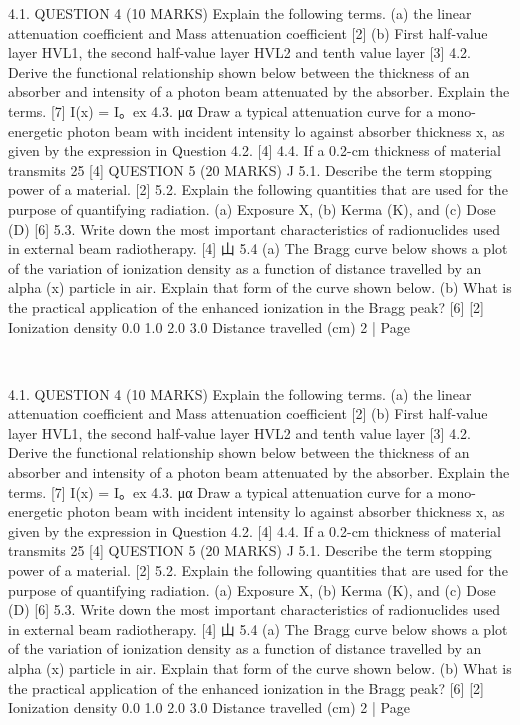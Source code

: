 \documentclass[addpoints]{exam}
\begin{document}
\begin{questions}
\begin{parts}
4.1.
QUESTION 4 (10 MARKS)
Explain the following terms.
(a) the linear attenuation coefficient and Mass attenuation coefficient
[2]
(b) First half-value layer HVL1, the second half-value layer HVL2 and tenth value layer [3]
4.2.
Derive the functional relationship shown below between the thickness of an absorber and intensity of a photon beam attenuated by the absorber. Explain the terms.
[7]
I(x) = I。ex
4.3.
μα
Draw a typical attenuation curve for a mono-energetic photon beam with incident intensity lo against absorber thickness x, as given by the expression in Question 4.2. [4]
4.4. If a 0.2-cm thickness of material transmits 25%
[4]
QUESTION 5 (20 MARKS)
J
5.1. Describe the term stopping power of a material.
[2]
5.2.
Explain the following quantities that are used for the purpose of quantifying radiation. (a) Exposure X, (b) Kerma (K),
and (c) Dose (D)
[6]
5.3.
Write down the most important characteristics of radionuclides used in external beam radiotherapy.
[4]
山
5.4 (a) The Bragg curve below shows a plot of the variation of ionization density as a function of distance travelled by an alpha (x) particle in air. Explain that form of the curve shown below.
(b) What is the practical application of the enhanced ionization in the Bragg peak?
[6]
[2]
Ionization density
0.0
1.0
2.0
3.0
Distance travelled (cm)
2 | Page

﻿

4.1.
QUESTION 4 (10 MARKS)
Explain the following terms.
(a) the linear attenuation coefficient and Mass attenuation coefficient
[2]
(b) First half-value layer HVL1, the second half-value layer HVL2 and tenth value layer [3]
4.2.
Derive the functional relationship shown below between the thickness of an absorber and intensity of a photon beam attenuated by the absorber. Explain the terms.
[7]
I(x) = I。ex
4.3.
μα
Draw a typical attenuation curve for a mono-energetic photon beam with incident intensity lo against absorber thickness x, as given by the expression in Question 4.2. [4]
4.4. If a 0.2-cm thickness of material transmits 25%
[4]
QUESTION 5 (20 MARKS)
J
5.1. Describe the term stopping power of a material.
[2]
5.2.
Explain the following quantities that are used for the purpose of quantifying radiation. (a) Exposure X, (b) Kerma (K),
and (c) Dose (D)
[6]
5.3.
Write down the most important characteristics of radionuclides used in external beam radiotherapy.
[4]
山
5.4 (a) The Bragg curve below shows a plot of the variation of ionization density as a function of distance travelled by an alpha (x) particle in air. Explain that form of the curve shown below.
(b) What is the practical application of the enhanced ionization in the Bragg peak?
[6]
[2]
Ionization density
0.0
1.0
2.0
3.0
Distance travelled (cm)
2 | Page
\end{parts}
\end{questions}
\end{document}
